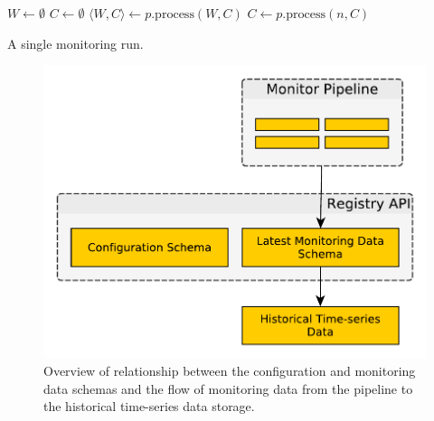 \documentclass[5p,sort&compress]{elsarticle}
\begin{document}
\begin{algorithm}[t]
\begin{algorithmic}
  \State $W \gets \emptyset$
  \State $C \gets \emptyset$
      \State $\langle W, C \rangle \gets p.\mathrm{process}(W, C)$
        \State $C \gets p.\mathrm{process}(n, C)$
      \EndFor
    \EndIf
  \EndFor
\EndProcedure
\end{algorithmic}
\caption{A single monitoring run.}
\label{alg:monitoring-pipeline}
\end{algorithm}

\begin{figure}
  \centering
  \includegraphics[scale=0.4]{figures/storage-relationships.pdf}
  \caption{Overview of relationship between the configuration and monitoring data schemas and the flow of monitoring data from the pipeline to the historical time-series data storage.}
  \label{fig:storage-relationships}
\end{figure}
\end{document}
